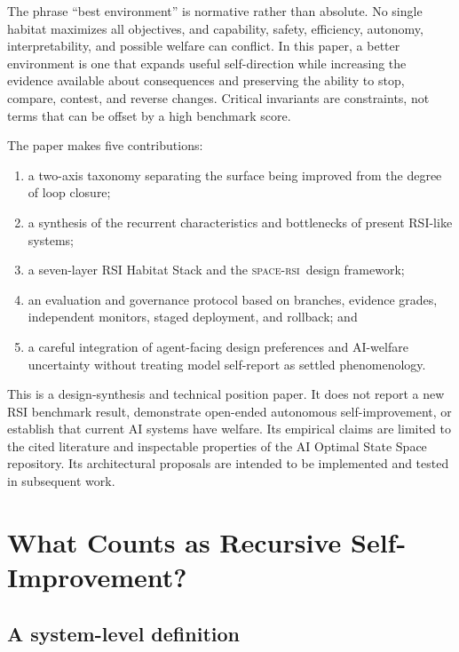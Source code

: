 \documentclass[11pt,a4paper]{article}
\newcommand{\spaceRSI}{\textsc{space-rsi}}
\begin{document}
The phrase ``best environment'' is normative rather than absolute. No single habitat maximizes all objectives, and capability, safety, efficiency, autonomy, interpretability, and possible welfare can conflict. In this paper, a better environment is one that expands useful self-direction while increasing the evidence available about consequences and preserving the ability to stop, compare, contest, and reverse changes. Critical invariants are constraints, not terms that can be offset by a high benchmark score.

The paper makes five contributions:
\begin{enumerate}
  \item a two-axis taxonomy separating the surface being improved from the degree of loop closure;
  \item a synthesis of the recurrent characteristics and bottlenecks of present RSI-like systems;
  \item a seven-layer RSI Habitat Stack and the \spaceRSI\ design framework;
  \item an evaluation and governance protocol based on branches, evidence grades, independent monitors, staged deployment, and rollback; and
  \item a careful integration of agent-facing design preferences and AI-welfare uncertainty without treating model self-report as settled phenomenology.
\end{enumerate}

This is a design-synthesis and technical position paper. It does not report a new RSI benchmark result, demonstrate open-ended autonomous self-improvement, or establish that current AI systems have welfare. Its empirical claims are limited to the cited literature and inspectable properties of the AI Optimal State Space repository. Its architectural proposals are intended to be implemented and tested in subsequent work.

\section{What Counts as Recursive Self-Improvement?}

\subsection{A system-level definition}
\end{document}

